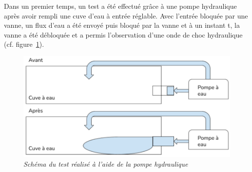 \subsubsection{}
Dans un premier temps, un test a été effectué grâce à une pompe hydraulique après avoir rempli une cuve d’eau à entrée réglable. Avec l’entrée bloquée par une vanne, un flux d’eau a été envoyé puis bloqué par la vanne et à un instant t, la vanne a été débloquée et a permis l’observation d’une onde de choc hydraulique (cf. figure~\ref{fig:choc_hydro}).
\begin{figure}[H]
	\centering
	\includegraphics[scale = 0.4]{figures/choc_hydro.png}
	\caption{\small{\textit{Schéma du test réalisé à l'aide de la pompe hydraulique}}}
	\label{fig:choc_hydro}
\end{figure}
